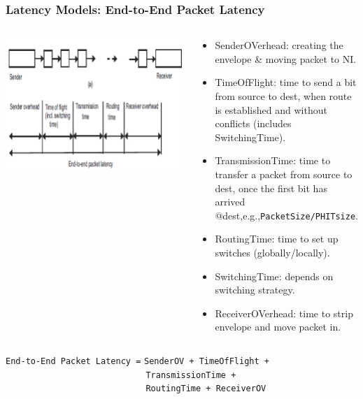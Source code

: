 \documentclass{beamer}
\newcommand{\emp}[1]{\textcolor{DikuRed}{ #1}}
\begin{document}
\begin{frame}[fragile,t]
\frametitle{Latency Models: End-to-End Packet Latency} 

\begin{columns}
\includegraphics[width=42ex]{FigsInterconnect/LatencyModel}
\begin{scriptsize}
\begin{itemize}
    \item \emp{SenderOV}erhead: creating the envelope \& moving packet to NI.
    \item \emp{TimeOfFlight}: time to send a bit from source to dest, when
                route is established and without conflicts (includes \emp{SwitchingTime}).
    \item \emp{TransmissionTime}: time to transfer a packet from source to dest, once
                the first bit has arrived @dest,e.g.,{\tt PacketSize/PHITsize}.
    \item \emp{RoutingTime}: time to set up switches (globally/locally).
    \item \emp{SwitchingTime}: depends on switching strategy.
    \item \emp{ReceiverOV}erhead: time to strip envelope and move packet in.
\end  {itemize}
\end{scriptsize}
\end{columns}
\bigskip

\alert{\tt End-to-End Packet Latency =} \emp{\tt SenderOV + TimeOfFlight + }
\emp{\tt~~~~~~~~~~~~~~~~~~~~~~~~~~~~TransmissionTime + }
\emp{\tt~~~~~~~~~~~~~~~~~~~~~~~~~~~~RoutingTime + ReceiverOV}

\end{frame}
\end{document}
